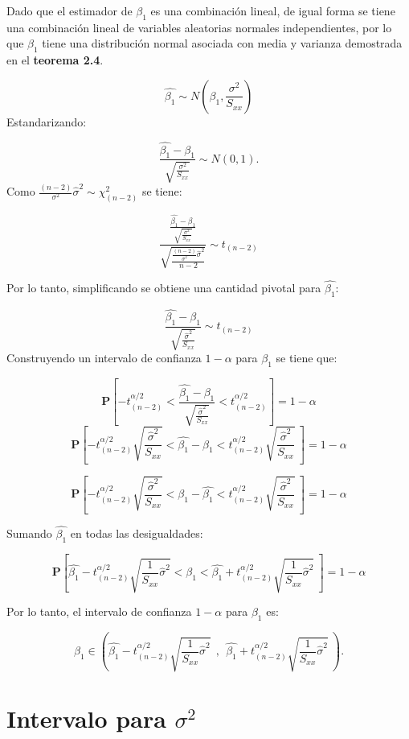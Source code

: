 \documentclass[
  a4paper,
  oneside,
  openany]{book}
\begin{document}
Dado que el estimador de \(\beta_{1}\) es una combinación lineal, de igual forma se tiene una combinación lineal de variables aleatorias normales independientes, por lo que \(\beta_{1}\) tiene una distribución normal asociada con media y varianza demostrada en el \textbf{teorema 2.4}.

\[\hat{\beta_{1}}\sim N \left(\beta_{1},\frac{\sigma^2}{S_{xx}}\right)\]
Estandarizando:

\[\frac{\hat{\beta_{1}}-\beta_{1}}{\sqrt{\frac{\sigma^2}{S_{xx}}}}\sim N(0,1).\]
Como \(\frac{(n-2)}{\sigma^2}\hat{\sigma}^2\sim\chi^2_{(n-2)}\) se tiene:

\[\frac{\frac{\hat{\beta_{1}}-\beta_{1}}{\sqrt{\frac{\sigma^2}{S_{xx}}}}}{\sqrt{\frac{\frac{(n-2)}{\sigma^2}\hat{\sigma}^2}{n-2}}} \sim t_{(n-2)}\]

Por lo tanto, simplificando se obtiene una cantidad pivotal para \(\hat{\beta_{1}}:\)

\[\frac{\hat{\beta_{1}}-\beta_{1}}{\sqrt{\frac{\hat{\sigma}^2}{S_{xx}}}}\sim t_{(n-2)}\]
Construyendo un intervalo de confianza \(1-\alpha\) para \(\beta_{1}\) se tiene que:

\[\mathbf{P}\left[-t^{\alpha/2}_{(n-2)} < \frac{\hat{\beta_{1}}-\beta_{1}}{\sqrt{\frac{\hat{\sigma}^2}{S_{xx}}}} < t^{\alpha/2}_{(n-2)}\right]=1-\alpha\]
\[\mathbf{P}\left[-t^{\alpha/2}_{(n-2)} \sqrt{\frac{\hat{\sigma}^2}{S_{xx}}} < \hat{\beta_{1}}-\beta_{1}< t^{\alpha/2}_{(n-2)} \sqrt{\frac{\hat{\sigma}^2}{S_{xx}}} \ \right]=1-\alpha\]

\[\mathbf{P}\left[-t^{\alpha/2}_{(n-2)} \sqrt{\frac{\hat{\sigma}^2}{S_{xx}}} < \beta_{1}-\hat{\beta_{1}}< t^{\alpha/2}_{(n-2)} \sqrt{\frac{\hat{\sigma}^2}{S_{xx}}} \ \right]=1-\alpha\]

Sumando \(\hat{\beta_{1}}\) en todas las desigualdades:

\[\mathbf{P}\left[\hat{\beta_{1}}-t^{\alpha/2}_{(n-2)} \sqrt{\frac{1}{S_{xx}}\hat{\sigma}^2} < \beta_{1}< \hat{\beta_{1}}+t^{\alpha/2}_{(n-2)} \sqrt{\frac{1}{S_{xx}}\hat{\sigma}^2} \ \right]=1-\alpha\]

Por lo tanto, el intervalo de confianza \(1-\alpha\) para \(\beta_{1}\) es:

\[\beta_{1} \in \left( \hat{\beta_{1}}-t^{\alpha/2}_{(n-2)} \sqrt{\frac{1}{S_{xx}}\hat{\sigma}^2} \ \ , \ \ \hat{\beta_{1}}+t^{\alpha/2}_{(n-2)} \sqrt{\frac{1}{S_{xx}}\hat{\sigma}^2} \  \right).\]

\hypertarget{intervalo-para-sigma2}{%
\section{\texorpdfstring{Intervalo para \(\sigma^2\)}{Intervalo para \textbackslash sigma\^{}2}}\label{intervalo-para-sigma2}}
\end{document}
